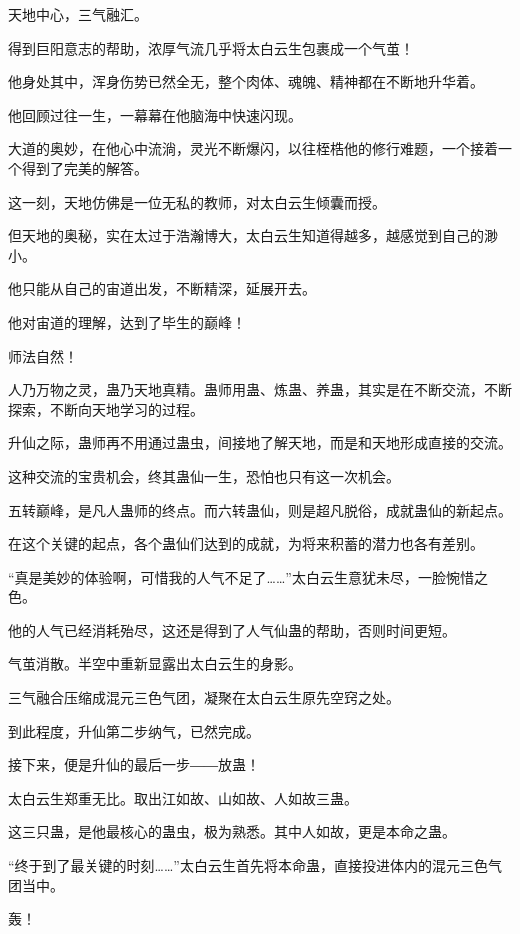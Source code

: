 
\begin{this_body}

天地中心，三气融汇。

得到巨阳意志的帮助，浓厚气流几乎将太白云生包裹成一个气茧！

他身处其中，浑身伤势已然全无，整个肉体、魂魄、精神都在不断地升华着。

他回顾过往一生，一幕幕在他脑海中快速闪现。

大道的奥妙，在他心中流淌，灵光不断爆闪，以往桎梏他的修行难题，一个接着一个得到了完美的解答。

这一刻，天地仿佛是一位无私的教师，对太白云生倾囊而授。

但天地的奥秘，实在太过于浩瀚博大，太白云生知道得越多，越感觉到自己的渺小。

他只能从自己的宙道出发，不断精深，延展开去。

他对宙道的理解，达到了毕生的巅峰！

师法自然！

人乃万物之灵，蛊乃天地真精。蛊师用蛊、炼蛊、养蛊，其实是在不断交流，不断探索，不断向天地学习的过程。

升仙之际，蛊师再不用通过蛊虫，间接地了解天地，而是和天地形成直接的交流。

这种交流的宝贵机会，终其蛊仙一生，恐怕也只有这一次机会。

五转巅峰，是凡人蛊师的终点。而六转蛊仙，则是超凡脱俗，成就蛊仙的新起点。

在这个关键的起点，各个蛊仙们达到的成就，为将来积蓄的潜力也各有差别。

“真是美妙的体验啊，可惜我的人气不足了……”太白云生意犹未尽，一脸惋惜之色。

他的人气已经消耗殆尽，这还是得到了人气仙蛊的帮助，否则时间更短。

气茧消散。半空中重新显露出太白云生的身影。

三气融合压缩成混元三色气团，凝聚在太白云生原先空窍之处。

到此程度，升仙第二步纳气，已然完成。

接下来，便是升仙的最后一步――放蛊！

太白云生郑重无比。取出江如故、山如故、人如故三蛊。

这三只蛊，是他最核心的蛊虫，极为熟悉。其中人如故，更是本命之蛊。

“终于到了最关键的时刻……”太白云生首先将本命蛊，直接投进体内的混元三色气团当中。

轰！


\end{this_body}
